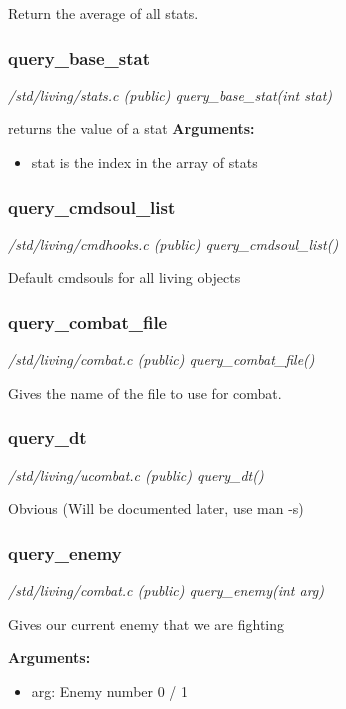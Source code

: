 Return the average of all stats.


\subsubsection{query\_base\_stat}

{\em /std/living/stats.c (public) query\_base\_stat(int stat)}

returns the value of a stat
{\bf Arguments:}
\begin{itemize}
\item stat is the index in the array of stats
\end{itemize}

\subsubsection{query\_cmdsoul\_list}

{\em /std/living/cmdhooks.c (public) query\_cmdsoul\_list()}

Default cmdsouls for all living objects


\subsubsection{query\_combat\_file}

{\em /std/living/combat.c (public) query\_combat\_file()}

Gives the name of the file to use for combat.


\subsubsection{query\_dt}

{\em /std/living/ucombat.c (public) query\_dt()}

Obvious (Will be documented later, use man -s)


\subsubsection{query\_enemy}

{\em /std/living/combat.c (public) query\_enemy(int arg)}

Gives our current enemy that we are fighting

{\bf Arguments:}
\begin{itemize}
\item      arg: Enemy number 0 / 1
\end{itemize}


